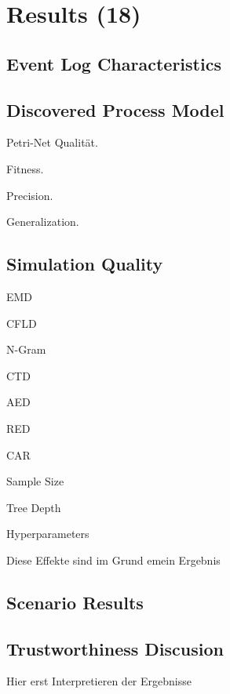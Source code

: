 \chapter{Results (18)}
\label{chp:results}

\section{Event Log Characteristics}

\section{Discovered Process Model}

Petri-Net Qualität.

Fitness.

Precision.

Generalization.


\section{Simulation Quality}

EMD

CFLD

N-Gram

CTD

AED

RED

CAR

Sample Size

Tree Depth

Hyperparameters

Diese Effekte sind im Grund emein Ergebnis

\section{Scenario Results}


\section{Trustworthiness Discusion}
Hier erst Interpretieren der Ergebnisse
